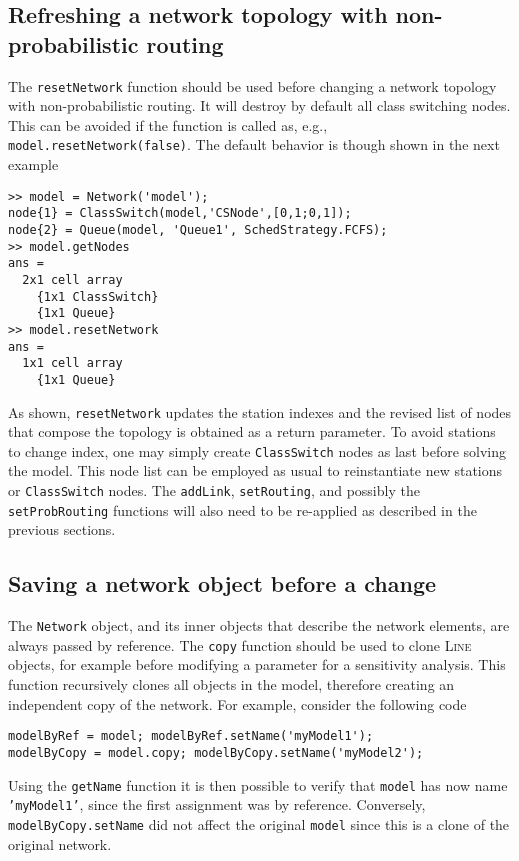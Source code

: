 \subsection{Refreshing a network topology with non-probabilistic routing}
The \texttt{resetNetwork} function should be used before changing a network topology with non-probabilistic routing. It will destroy by default all class switching nodes. This can be avoided if the function is called as, e.g., \texttt{model.resetNetwork(false)}. The default behavior is though shown in the next example
\begin{lstlisting}
>> model = Network('model');
node{1} = ClassSwitch(model,'CSNode',[0,1;0,1]);
node{2} = Queue(model, 'Queue1', SchedStrategy.FCFS);
>> model.getNodes
ans =
  2x1 cell array
    {1x1 ClassSwitch}
    {1x1 Queue}
>> model.resetNetwork
ans =
  1x1 cell array
    {1x1 Queue}
\end{lstlisting}
As shown, \texttt{resetNetwork} updates the station indexes and the revised list of nodes that compose the topology is obtained as a return parameter. To avoid stations to change index, one may simply create  \texttt{ClassSwitch} nodes as last before solving the model. This node list can be employed as usual to reinstantiate new stations or \texttt{ClassSwitch} nodes. The \texttt{addLink}, \texttt{setRouting}, and possibly the \texttt{setProbRouting} functions will also need to be re-applied as described in the previous sections.

\subsection{Saving a network object before a change}
The \texttt{Network} object, and its inner objects that describe the network elements, are always passed by reference. The \texttt{copy} function should be used to clone \textsc{Line} objects, for example before modifying a parameter for a sensitivity analysis. This function recursively clones all objects in the model, therefore creating an independent copy of the network. For example, consider the following code
\begin{lstlisting}
modelByRef = model; modelByRef.setName('myModel1');
modelByCopy = model.copy; modelByCopy.setName('myModel2');
\end{lstlisting}
Using the \texttt{getName} function it is then possible to verify that \texttt{model} has now name \texttt{'myModel1'}, since the first assignment was by reference. Conversely, \texttt{modelByCopy.setName} did not affect the original \texttt{model} since this is a clone of the original network.

